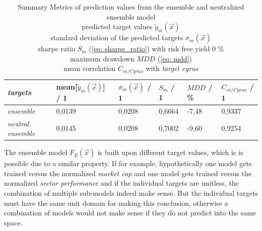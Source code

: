 \documentclass[12pt, a4paper]{article}
\begin{document}
\begin{table}[!htbp]
\centering
\caption{Summary Metrics of prediction values from the ensemble and neutralized ensemble model \\
predicted target values $\tilde{y}_m(\vec{x})$ \\
standard deviation of the predicted targets $\sigma_m(\vec{x})$ \\
sharpe ratio $S_m$ (\ref{eq: sharpe_ratio}) with risk free yield 0 \% \\
maximum drawdown $MDD$ (\ref{eq: mdd}) \\
mean correlation $C_{m/Cyrus}$ with \textit{target cyrus} \\}
\label{table: summary_metric_predictions_neutral_ensemble}
\begin{tabular}{|l|l|l|l|l|l|}
\hline
\textit{targets} & mean[$\tilde{y}_m(\vec{x})$] / 1 & $\sigma_m(\vec{x})$ / 1 & $S_m$ / 1 & $MDD$ / \% & $C_{m/Cyrus}$ / 1 \\ \hline
\hline
\hline
\textit{ensemble} & 0,0139 & 0,0208 & 0,6664 & -7,48 & 0,9337 \\ \hline
\hline
\textit{neutral. ensemble} & 0,0145 & 0,0208 & 0,7002 & -9,60 & 0,9254 \\ \hline
\end{tabular}
\end{table}
The ensemble model $F_E(\vec{x})$ is built upon different target values, which is is possible due to a similar property. If for example, hypothetically one model gets trained versus the normalized \textit{market cap} and one model gets trained versus the normalized \textit{sector performance} and if the individual targets are unitless, the combination of multiple sub-models indeed make sense. But the individual targets must have the same unit domain for making this conclusion, otherwise a combination of models would not make sense if they do not predict into the same space. \\
\newpage
\end{document}
